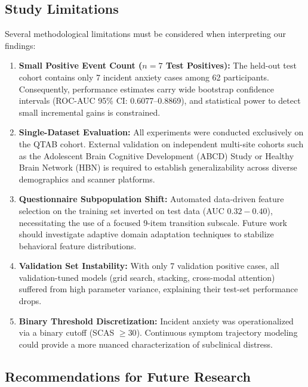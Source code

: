 \documentclass[10pt,letterpaper]{article}
\begin{document}
\subsection*{Study Limitations}

Several methodological limitations must be considered when interpreting our findings:
\begin{enumerate}
    \item \textbf{Small Positive Event Count ($n=7$ Test Positives):} The held-out test cohort contains only 7 incident anxiety cases among 62 participants. Consequently, performance estimates carry wide bootstrap confidence intervals (ROC-AUC 95\% CI: 0.6077--0.8869), and statistical power to detect small incremental gains is constrained.
    \item \textbf{Single-Dataset Evaluation:} All experiments were conducted exclusively on the QTAB cohort. External validation on independent multi-site cohorts such as the Adolescent Brain Cognitive Development (ABCD) Study or Healthy Brain Network (HBN) is required to establish generalizability across diverse demographics and scanner platforms.
    \item \textbf{Questionnaire Subpopulation Shift:} Automated data-driven feature selection on the training set inverted on test data (AUC $0.32-0.40$), necessitating the use of a focused 9-item transition subscale. Future work should investigate adaptive domain adaptation techniques to stabilize behavioral feature distributions.
    \item \textbf{Validation Set Instability:} With only 7 validation positive cases, all validation-tuned models (grid search, stacking, cross-modal attention) suffered from high parameter variance, explaining their test-set performance drops.
    \item \textbf{Binary Threshold Discretization:} Incident anxiety was operationalized via a binary cutoff (SCAS $\ge 30$). Continuous symptom trajectory modeling could provide a more nuanced characterization of subclinical distress.
\end{enumerate}

\subsection*{Recommendations for Future Research}
\end{document}
